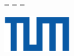 \begin{titlepage}
	\oddsidemargin=\evensidemargin\relax
	\textwidth=\dimexpr{}\evensidemargin-2in\relax
	\hsize=\textwidth\relax
	
	\centering
	
	\includegraphics[width=35mm]{logos/tum}
	
	
	\vspace{5mm}
	{\huge\MakeUppercase{\getUniversity{}}}\\
	
	\vspace{5mm}
	{\large\MakeUppercase{\getGroup{}}}\\
	
	\vspace{15mm}
	{\LARGE \getDoctype{}}\\
	
	\vspace{15mm}
	{\huge\bfseries \getTitleGer{}}\\
	
	\vspace{15mm}
	{\LARGE \getAuthor{}}
	
	\vspace{20mm}
	
\end{titlepage}
